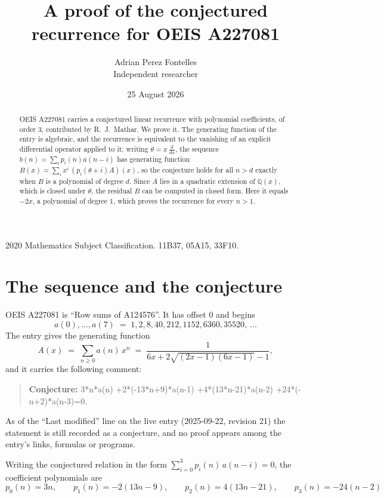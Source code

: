 \documentclass[11pt,a4paper]{article}
\title{A proof of the conjectured recurrence for OEIS A227081}
\author{Adrian Perez Fontelles\\ \small Independent researcher}
\date{25 August 2026}
\theoremstyle{plain}
\theoremstyle{definition}
\begin{document}
\maketitle

\begin{abstract}
OEIS A227081 carries a conjectured linear recurrence with polynomial coefficients, of
order 3, contributed by R.~J.~Mathar. We prove it. The generating function of the
entry is algebraic, and the recurrence is equivalent to the vanishing of an explicit
differential operator applied to it: writing $\theta=x\,\frac{d}{dx}$, the sequence
$b(n)=\sum_{i}p_{i}(n)a(n-i)$ has generating function
$B(x)=\sum_{i}x^{i}\,(p_{i}(\theta+i)A)(x)$, so the conjecture holds for all $n>d$ exactly
when $B$ is a polynomial of degree $d$. Since $A$ lies in a quadratic extension of
$\mathbb{Q}(x)$, which is closed under $\theta$, the residual $B$ can be computed in
closed form. Here it equals $- 2 x$, a polynomial of degree $1$, which proves
the recurrence for every $n>1$.
\end{abstract}

\noindent\small 2020 Mathematics Subject Classification. 11B37, 05A15, 33F10.\normalsize

\section{The sequence and the conjecture}

OEIS A227081 is ``Row sums of A124576''. It has offset $0$ and begins
\[
a(0),\dots,a(7)\;=\;1, 2, 8, 40, 212, 1152, 6360, 35520,\ \dots
\]
The entry gives the generating function
\begin{equation}\label{eq:gf}
A(x)\;=\;\sum_{n\ge 0} a(n)\,x^{n}\;=\;\frac{1}{6 x + 2 \sqrt{\left(2 x - 1\right) \left(6 x - 1\right)} - 1} ,
\end{equation}
and it carries the following comment:
\begin{quote}\small
\textbf{Conjecture:} 3*n*a(n) +2*(-13*n+9)*a(n-1) +4*(13*n-21)*a(n-2) +24*(-n+2)*a(n-3)=0.
\end{quote}
As of the ``Last modified'' line on the live entry (2025-09-22, revision 21) the
statement is still recorded as a conjecture, and no proof appears among the entry's links,
formulas or programs.

Writing the conjectured relation in the form $\sum_{i=0}^{3}p_{i}(n)\,a(n-i)=0$,
the coefficient polynomials are
\[
p_{0}(n)=3 n,\qquad p_{1}(n)=- 2 \left(13 n - 9\right),\qquad p_{2}(n)=4 \left(13 n - 21\right),\qquad p_{3}(n)=- 24 \left(n - 2\right)
\]
\end{document}
